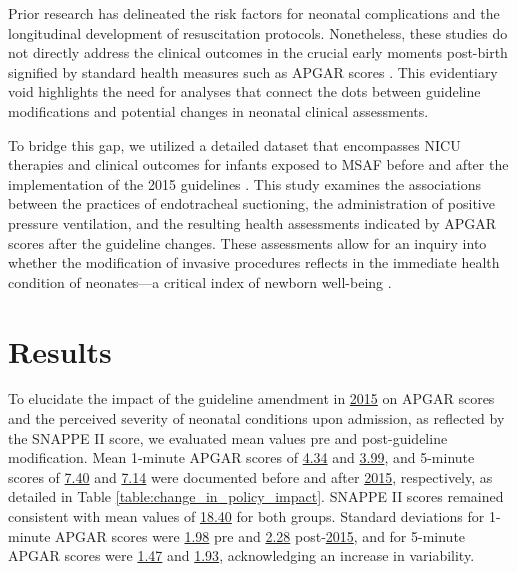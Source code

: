 \documentclass[11pt]{article}
\begin{document}
Prior research has delineated the risk factors for neonatal complications and the longitudinal development of resuscitation protocols. Nonetheless, these studies do not directly address the clinical outcomes in the crucial early moments post-birth signified by standard health measures such as APGAR scores \cite{Fischer2011APS}. This evidentiary void highlights the need for analyses that connect the dots between guideline modifications and potential changes in neonatal clinical assessments.

To bridge this gap, we utilized a detailed dataset that encompasses NICU therapies and clinical outcomes for infants exposed to MSAF before and after the implementation of the 2015 guidelines \cite{Stevenson2019ADO}. This study examines the associations between the practices of endotracheal suctioning, the administration of positive pressure ventilation, and the resulting health assessments indicated by APGAR scores after the guideline changes. These assessments allow for an inquiry into whether the modification of invasive procedures reflects in the immediate health condition of neonates—a critical index of newborn well-being \cite{Crews2021ClinicalPI, Singh2014TheIO}.

\section*{Results}

To elucidate the impact of the guideline amendment in \hyperlink{S0a}{2015} on APGAR scores and the perceived severity of neonatal conditions upon admission, as reflected by the SNAPPE II score, we evaluated mean values pre and post-guideline modification. Mean 1-minute APGAR scores of \hyperlink{A1b}{4.34} and \hyperlink{A1c}{3.99}, and 5-minute scores of \hyperlink{A2b}{7.40} and \hyperlink{A2c}{7.14} were documented before and after \hyperlink{S0a}{2015}, respectively, as detailed in Table \ref{table:change_in_policy_impact}. SNAPPE II scores remained consistent with mean values of \hyperlink{A3a}{18.40} for both groups. Standard deviations for 1-minute APGAR scores were \hyperlink{A4b}{1.98} pre and \hyperlink{A4c}{2.28} post-\hyperlink{S0a}{2015}, and for 5-minute APGAR scores were \hyperlink{A5b}{1.47} and \hyperlink{A5c}{1.93}, acknowledging an increase in variability.
\end{document}

